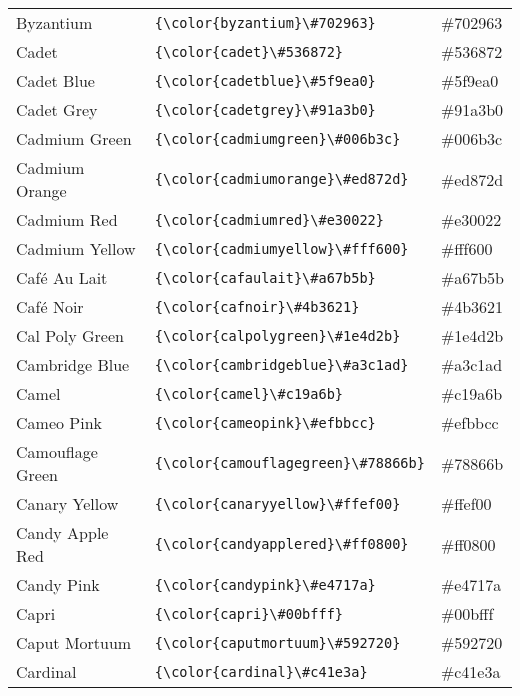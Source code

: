 \documentclass[9.5pt]{article}
\begin{document}
\begin{longtable}{l | l | l}
	Byzantium & \verb!{\color{byzantium}\#702963}! & {\color{byzantium}\#702963}\\
	Cadet & \verb!{\color{cadet}\#536872}! & {\color{cadet}\#536872}\\
	Cadet Blue & \verb!{\color{cadetblue}\#5f9ea0}! & {\color{cadetblue}\#5f9ea0}\\
	Cadet Grey & \verb!{\color{cadetgrey}\#91a3b0}! & {\color{cadetgrey}\#91a3b0}\\
	Cadmium Green & \verb!{\color{cadmiumgreen}\#006b3c}! & {\color{cadmiumgreen}\#006b3c}\\
	Cadmium Orange & \verb!{\color{cadmiumorange}\#ed872d}! & {\color{cadmiumorange}\#ed872d}\\
	Cadmium Red & \verb!{\color{cadmiumred}\#e30022}! & {\color{cadmiumred}\#e30022}\\
	Cadmium Yellow & \verb!{\color{cadmiumyellow}\#fff600}! & {\color{cadmiumyellow}\#fff600}\\
	Café Au Lait & \verb!{\color{cafaulait}\#a67b5b}! & {\color{cafaulait}\#a67b5b}\\
	Café Noir & \verb!{\color{cafnoir}\#4b3621}! & {\color{cafnoir}\#4b3621}\\
	Cal Poly Green & \verb!{\color{calpolygreen}\#1e4d2b}! & {\color{calpolygreen}\#1e4d2b}\\
	Cambridge Blue & \verb!{\color{cambridgeblue}\#a3c1ad}! & {\color{cambridgeblue}\#a3c1ad}\\
	Camel & \verb!{\color{camel}\#c19a6b}! & {\color{camel}\#c19a6b}\\
	Cameo Pink & \verb!{\color{cameopink}\#efbbcc}! & {\color{cameopink}\#efbbcc}\\
	Camouflage Green & \verb!{\color{camouflagegreen}\#78866b}! & {\color{camouflagegreen}\#78866b}\\
	Canary Yellow & \verb!{\color{canaryyellow}\#ffef00}! & {\color{canaryyellow}\#ffef00}\\
	Candy Apple Red & \verb!{\color{candyapplered}\#ff0800}! & {\color{candyapplered}\#ff0800}\\
	Candy Pink & \verb!{\color{candypink}\#e4717a}! & {\color{candypink}\#e4717a}\\
	Capri & \verb!{\color{capri}\#00bfff}! & {\color{capri}\#00bfff}\\
	Caput Mortuum & \verb!{\color{caputmortuum}\#592720}! & {\color{caputmortuum}\#592720}\\
	Cardinal & \verb!{\color{cardinal}\#c41e3a}! & {\color{cardinal}\#c41e3a}\\

\end{longtable}
\end{document}
